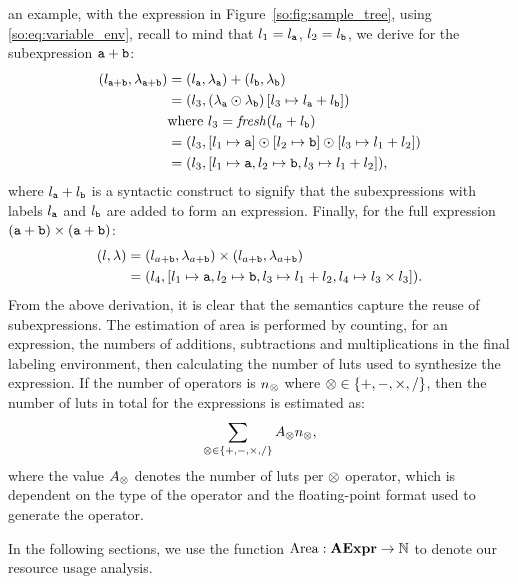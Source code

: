an example, with the expression in Figure~\ref{so:fig:sample_tree}, using
\eqref{so:eq:variable_env}, recall to mind that $l_1 = l_{\texttt{a}}$, $l_2 =
l_{\texttt{b}}$, we derive for the subexpression $\texttt{a} + \texttt{b}$:
\begin{equation}
    \begin{aligned}
        (l_{\texttt{a} + \texttt{b}}, \lambda_{\texttt{a} + \texttt{b}})
            &= (l_{\texttt{a}}, \lambda_{\texttt{a}}) + (l_{\texttt{b}}, \lambda_{\texttt{b}}) \\
            &= \left(l_3,
                \left( \lambda_{\texttt{a}} \odot \lambda_{\texttt{b}} \right)
                    \left[ l_3\mapsto{l_{\texttt{a}}+ l_{\texttt{b}}} \right]
               \right) \\
            &  \text{where~} l_3 = \operatorname{\mathit{fresh}}(l_a + l_{\texttt{b}}) \\
            &= (l_3, [l_1\mapsto{\texttt{a}}]\odot
                     [l_2\mapsto{\texttt{b}}]\odot
                     [l_3\mapsto{l_1 + l_2}]) \\
            &= (l_3, [
                 l_1\mapsto{\texttt{a}},
                 l_2\mapsto{\texttt{b}},
                 l_3\mapsto{l_1 + l_2}
               ]),
    \end{aligned}
\end{equation}
where $l_{\texttt{a}} + l_{\texttt{b}}$ is a syntactic construct to signify that the
subexpressions with labels $l_{\texttt{a}}$ and $l_{\texttt{b}}$ are added to form an
expression.
Finally, for the full expression $(\texttt{a} + \texttt{b}) \times (\texttt{a} + \texttt{b})$:
\begin{equation}
    \begin{aligned}
        (l, \lambda)
            &= (l_{a + \texttt{b}}, \lambda_{a + \texttt{b}}) \times
               (l_{a + \texttt{b}}, \lambda_{a + \texttt{b}}) \\
            &= (l_4, [l_1\mapsto{\texttt{a}}, l_2\mapsto{\texttt{b}},
                      l_3\mapsto{l_1 + l_2}, l_4\mapsto{l_3 \times l_3}]).
    \end{aligned}
\end{equation}
From the above derivation, it is clear that the semantics capture the reuse
of subexpressions. The estimation of area is performed by counting, for an
expression, the numbers of additions, subtractions and multiplications in the
final labeling environment, then calculating the number of \glspl{lut} used to
synthesize the expression. If the number of operators is $n_\otimes$ where
$\otimes \in \{+, -, \times, /\}$, then the number of \glspl{lut} in total
for the expressions is estimated as:
\begin{equation}
    \sum_{\otimes\in\{+,-,\times,/\}} A_\otimes n_\otimes,
\end{equation}
where the value $A_\otimes$ denotes the number of \glspl{lut} per $\otimes$
operator, which is dependent on the type of the operator and the floating-point
format used to generate the operator.

In the following sections, we use the function $\operatorname{\mathrm{Area}}: \mathbf{AExpr}\to\mathbb{N}$
to denote our resource usage analysis.
